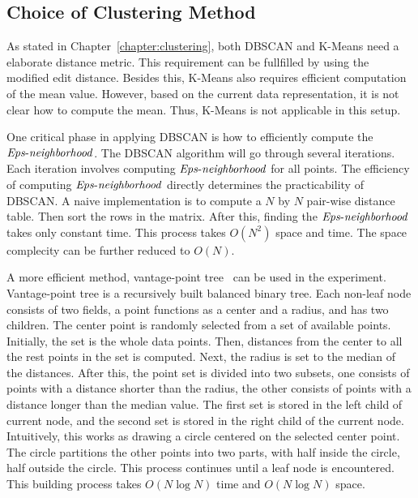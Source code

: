 \subsection{Choice of Clustering Method}
As stated in Chapter~\ref{chapter:clustering}, both DBSCAN and K-Means need a elaborate distance metric. This requirement can be fullfilled by using the modified edit distance. Besides this, K-Means also requires efficient computation of the mean value. However, based on the current data representation, it is not clear how to compute the mean. Thus, K-Means is not applicable in this setup. 

One critical phase in applying DBSCAN is how to efficiently compute the $\id{Eps-neighborhood}$.  The DBSCAN algorithm will go through several iterations. Each iteration involves computing $\id{Eps-neighborhood}$ for all points. The efficiency of computing $\id{Eps-neighborhood}$ directly determines the practicability of DBSCAN. A naive implementation is to compute a $N$ by $N$ pair-wise distance table. Then sort the rows in the matrix. After this, finding the $\id{Eps-neighborhood}$ takes only constant time. This process takes $O(N^2)$ space and time. The space complecity can be further reduced to $O(N)$.

A more efficient method, vantage-point tree~\cite{yianilos1993data} can be used in the experiment. Vantage-point tree is a recursively built balanced binary tree. Each non-leaf node consists of two fields, a point functions as a center and a radius, and has two children. The center point is randomly selected from a set of available points. Initially, the set is the whole data points. Then, distances from the center to all the rest points in the set is computed. Next, the radius is set to the median of the distances. After this, the point set is divided into two subsets, one consists of points with a distance shorter than the radius, the other consists of points with a distance longer than the median value. The first set is stored in the left child of current node, and the second set is stored in the right child of the current node. Intuitively, this works as drawing a circle centered on the selected center point. The circle partitions the other points into two parts, with half inside the circle, half outside the circle. This process continues until a leaf node is encountered. This building process takes $O(N \log N)$ time and $O(N \log N)$ space. 

